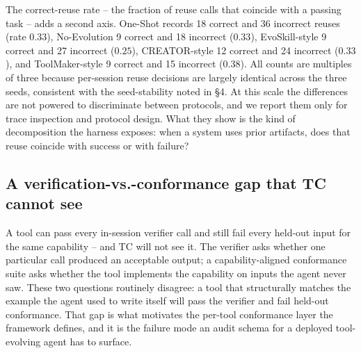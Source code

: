 \documentclass[sigconf,anonymous,natbib=false]{acmart}
\begin{document}
The correct-reuse rate -- the fraction of reuse calls that coincide with a passing task -- adds a second axis. One-Shot records 18 correct and 36 incorrect reuses (rate $0.33$), No-Evolution 9 correct and 18 incorrect ($0.33$), EvoSkill-style 9 correct and 27 incorrect ($0.25$), CREATOR-style 12 correct and 24 incorrect ($0.33$), and ToolMaker-style 9 correct and 15 incorrect ($0.38$). All counts are multiples of three because per-session reuse decisions are largely identical across the three seeds, consistent with the seed-stability noted in \S4. At this scale the differences are not powered to discriminate between protocols, and we report them only for trace inspection and protocol design. What they show is the kind of decomposition the harness exposes: when a system uses prior artifacts, does that reuse coincide with success or with failure?

\subsection{A verification-vs.-conformance gap that TC cannot see}
\label{sec:gap}

A tool can pass every in-session verifier call and still fail every held-out input for the same capability -- and TC will not see it. The verifier asks whether one particular call produced an acceptable output; a capability-aligned conformance suite asks whether the tool implements the capability on inputs the agent never saw. These two questions routinely disagree: a tool that structurally matches the example the agent used to write itself will pass the verifier and fail held-out conformance. That gap is what motivates the per-tool conformance layer the framework defines, and it is the failure mode an audit schema for a deployed tool-evolving agent has to surface.
\end{document}
